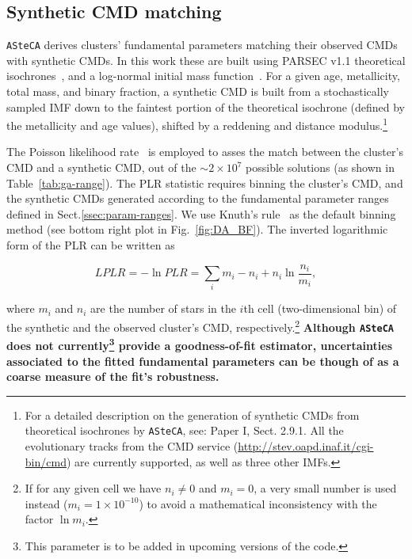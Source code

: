 \documentclass{aa}
\begin{document}

\subsection{Synthetic CMD matching}
\label{ssec:synth-match}

\texttt{ASteCA} derives clusters' fundamental parameters matching their observed
CMDs with synthetic CMDs. In this work these are built using PARSEC v1.1
theoretical isochrones~\citep[][B12]{Bressan_2012},
and a log-normal initial mass function~\citep[IMF,][]{Chabrier_2001}.
%
For a given age, metallicity, total mass, and binary fraction, a
synthetic CMD is built from a stochastically sampled IMF down to the
faintest portion of the theoretical isochrone (defined by the metallicity and
age values), shifted by a reddening and distance modulus.\footnote{For a
detailed description on the generation of synthetic CMDs from theoretical
isochrones by \texttt{ASteCA}, see: Paper I, Sect. 2.9.1. All the evolutionary
tracks from the CMD service (\url{http://stev.oapd.inaf.it/cgi-bin/cmd}) are
currently supported, as well as three other IMFs.}

The Poisson likelihood rate~\citep[PLR,][]{Dolphin_2002} is employed
to asses the match between the cluster's CMD and a synthetic
CMD, out of the ${\sim}2{\times}10^7$ possible solutions (as shown in
Table~\ref{tab:ga-range}).
The PLR statistic requires binning the cluster's CMD, and the synthetic CMDs
generated according to the fundamental parameter ranges defined in
Sect.\ref{ssec:param-ranges}.
We use Knuth's rule~\citep[][also implemented via the astroML package]
{Knuth_2006} as the default binning method (see bottom right plot in
Fig.~\ref{fig:DA_BF}).
The inverted logarithmic form of the PLR can be written as

\begin{equation}
LPLR  = -\ln PLR = \sum_i m_i - n_i + n_i \ln \frac{n_i}{m_i},
\label{eq:likelihood}
\end{equation}

\noindent where $m_i$ and $n_i$ are the number of stars in the $i$th cell
(two-dimensional bin) of the synthetic and the observed cluster's CMD,
respectively.\footnote{If for any given cell we have $n_i\neq0$ and $m_i=0$, a
very small number is used instead ($m_i=1{\times}10^{-10}$) to avoid a
mathematical inconsistency with the factor $\ln m_i$.}
\textbf{Although \texttt{ASteCA} does not currently\footnote{This parameter is
to be added in upcoming versions of the code.} provide a goodness-of-fit
estimator, uncertainties associated to the fitted fundamental parameters
can be though of as a coarse measure of the fit's robustness.}
\end{document}

